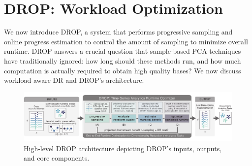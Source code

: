 \section{DROP: Workload Optimization}
\label{sec:algo}


We now introduce DROP, a system that performs progressive sampling and online progress estimation to control the amount of sampling to minimize overall runtime. 
DROP answers a crucial question that sample-based PCA techniques have traditionally ignored: how long should these methods run, and how much computation is actually required to obtain high quality bases? 
We now discuss workload-aware DR and DROP's architecture.

\begin{figure}
\label{fig:arch}
\begin{center}
\includegraphics[width=\textwidth]{figs/system_arch.pdf}\vspace{-1em}
\caption[]{High-level DROP architecture depicting DROP's inputs, outputs, and core components.}
\end{center}
\vspace{-1em}
\end{figure}

